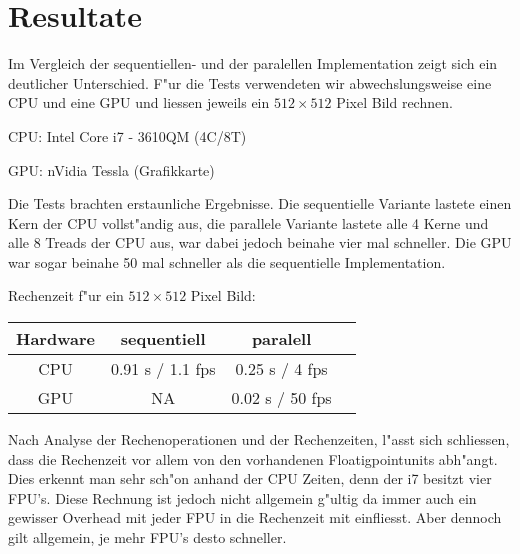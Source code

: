 \section{Resultate}
Im Vergleich der sequentiellen- und der paralellen Implementation
zeigt sich ein deutlicher Unterschied. F"ur die Tests verwendeten wir
abwechslungsweise eine CPU und eine GPU und liessen jeweils ein $512\times
512$ Pixel Bild rechnen. 

CPU: Intel Core i7 - 3610QM (4C/8T) 

GPU: nVidia Tessla (Grafikkarte) 

Die Tests brachten erstaunliche Ergebnisse. Die sequentielle Variante
lastete einen Kern der CPU vollst"andig aus, die parallele Variante
lastete alle 4 Kerne und alle 8 Treads der CPU aus, war dabei jedoch
beinahe vier mal schneller. Die GPU war sogar beinahe 50 mal schneller
als die sequentielle Implementation.

Rechenzeit f"ur ein $512\times 512$ Pixel Bild:
\begin{center}
\begin{tabular}[b]{|c|c|c|c|}
	\hline
	Hardware & sequentiell & paralell \\
	\hline \hline
	CPU & 0.91 s / 1.1 fps & 0.25 s / 4 fps \\
	\hline
	GPU & NA & 0.02 s / 50 fps \\
	\hline
\end{tabular}
\end{center}
	
Nach Analyse der Rechenoperationen und der Rechenzeiten, l"asst
sich schliessen, dass die Rechenzeit vor allem von den vorhandenen
Floatigpointunits abh"angt. Dies erkennt man sehr sch"on anhand der
CPU Zeiten, denn der i7 besitzt vier FPU's. Diese Rechnung ist jedoch
nicht allgemein g"ultig da immer auch ein gewisser Overhead mit jeder
FPU in die Rechenzeit mit einfliesst. Aber dennoch gilt allgemein,
je mehr FPU's desto schneller.



  

